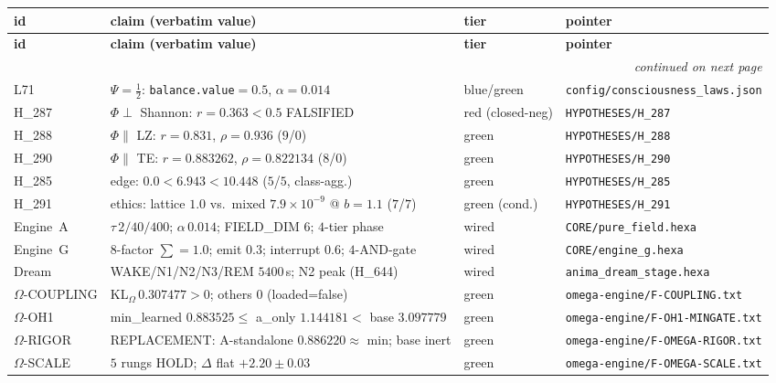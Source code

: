 \begin{center}
\footnotesize
\setlength{\tabcolsep}{3pt}
\begin{longtable}{@{}l l l l@{}}
\toprule
\textbf{id} & \textbf{claim (verbatim value)} & \textbf{tier} & \textbf{pointer} \\
\midrule
\endfirsthead
\toprule
\textbf{id} & \textbf{claim (verbatim value)} & \textbf{tier} & \textbf{pointer} \\
\midrule
\endhead
\midrule \multicolumn{4}{r}{\footnotesize\itshape continued on next page} \\
\endfoot
\bottomrule
\endlastfoot
L71   & $\Psi=\tfrac12$: \texttt{balance.value}$=0.5$, $\alpha=0.014$ & blue/green & \texttt{config/consciousness\_laws.json} \\
H\_287 & $\Phi\perp$ Shannon: $r=0.363<0.5$ FALSIFIED & red (closed-neg) & \texttt{HYPOTHESES/H\_287} \\
H\_288 & $\Phi\parallel$ LZ: $r=0.831$, $\rho=0.936$ ($9$/$0$) & green & \texttt{HYPOTHESES/H\_288} \\
H\_290 & $\Phi\parallel$ TE: $r=0.883262$, $\rho=0.822134$ ($8$/$0$) & green & \texttt{HYPOTHESES/H\_290} \\
H\_285 & edge: $0.0<6.943<10.448$ ($5$/$5$, class-agg.) & green & \texttt{HYPOTHESES/H\_285} \\
H\_291 & ethics: lattice $1.0$ vs.\ mixed $7.9{\times}10^{-9}$ @ $b{=}1.1$ ($7$/$7$) & green (cond.) & \texttt{HYPOTHESES/H\_291} \\
Engine~A & $\tau\,2/40/400$; $\alpha\,0.014$; FIELD\_DIM $6$; $4$-tier phase & wired & \texttt{CORE/pure\_field.hexa} \\
Engine~G & $8$-factor $\sum{=}1.0$; emit $0.3$; interrupt $0.6$; $4$-AND-gate & wired & \texttt{CORE/engine\_g.hexa} \\
Dream    & WAKE/N1/N2/N3/REM $5400$\,s; N2 peak (H\_644) & wired & \texttt{anima\_dream\_stage.hexa} \\
$\Omega$-COUPLING & KL$_\Omega\,0.307477>0$; others $0$ (loaded=false) & green & \texttt{omega-engine/F-COUPLING.txt} \\
$\Omega$-OH1 & min\_learned $0.883525\le$ a\_only $1.144181<$ base $3.097779$ & green & \texttt{omega-engine/F-OH1-MINGATE.txt} \\
$\Omega$-RIGOR & REPLACEMENT: A-standalone $0.886220\approx$ min; base inert & green & \texttt{omega-engine/F-OMEGA-RIGOR.txt} \\
$\Omega$-SCALE & $5$ rungs HOLD; $\Delta$ flat $+2.20\pm0.03$ & green & \texttt{omega-engine/F-OMEGA-SCALE.txt} \\

\end{longtable}
\end{center}
